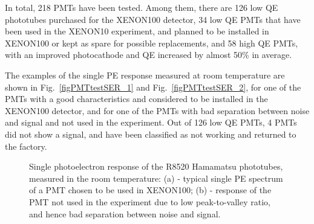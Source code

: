 In total, 218 PMTs have been tested. Among them, there are 126 low QE phototubes purchased for the XENON100 detector, 34 low QE PMTs that have been used in the XENON10 experiment, and planned to be installed in XENON100 or kept as spare for possible replacements, and 58 high QE PMTs, with an improved photocathode and QE increased by almost 50\% in average.

The examples of the single PE response measured at room temperature are shown in Fig.~\ref{figPMTtestSER_1} and Fig.~\ref{figPMTtestSER_2}, for one of the PMTs with a good characteristics and considered to be installed in the XENON100 detector, and for one of the PMTs with bad separation between noise and signal and not used in the experiment. Out of 126 low QE PMTs, 4 PMTs did not show a signal, and have been classified as not working and returned to the factory.

\begin{figure}[!t]
\centering
{}
\caption[Single photoelectron response of the R8520 Hamamatsu phototubes, measured in the room temperature]{Single photoelectron response of the R8520 Hamamatsu phototubes, measured in the room temperature: (a) - typical single PE spectrum of a PMT chosen to be used in XENON100; (b) - response of the PMT not used in the experiment due to low peak-to-valley ratio, and hence bad separation between noise and signal.}
\label{figPMTtestSER}
\end{figure}

